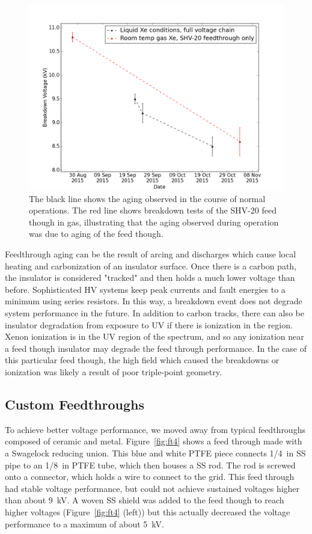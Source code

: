 \begin{figure}[htbp]
\begin{center}
\includegraphics[width=5in]{figures/testbed/shv20_breakdowns.png}
\caption{The black line shows the aging observed in the course of normal operations. The red line shows breakdown tests of the SHV-20 feed though in gas, illustrating that the aging observed during operation was due to aging of the feed though.}
\label{fig:aging}
\end{center}
\end{figure}

Feedthrough aging can be the result of arcing and discharges which cause local heating and carbonization of an insulator surface. Once there is a carbon path, the insulator is considered "tracked" and then holds a much lower voltage than before.  Sophisticated \ac{HV} systems keep peak currents and fault energies to a minimum using series resistors. In this way, a breakdown event does not degrade system performance in the future. In addition to carbon tracks, there can also be insulator degradation from exposure to UV if there is ionization in the region. Xenon ionization is in the UV region of the spectrum, and so any ionization near a feed though insulator may degrade the feed through performance. In the case of this particular feed though, the high field which caused the breakdowns or ionization was likely a result of poor triple-point geometry. 


\subsection{Custom Feedthroughs}
To achieve better voltage performance, we moved away from typical feedthroughs composed of ceramic and metal. Figure~\ref{fig:ft4} shows a feed through made with a Swagelock reducing union. This blue and white PTFE piece connects 1/4~in \ac{SS} pipe to an 1/8~in PTFE tube, which then houses a \ac{SS} rod. The rod is screwed onto a connector, which holds a wire to connect to the grid. This feed through had stable voltage performance, but could not achieve sustained voltages higher than about 9~kV. A woven \ac{SS} shield was added to the feed though to reach higher voltages (Figure~\ref{fig:ft4} (left)) but this actually decreased the voltage performance to a maximum of about 5~kV.   

